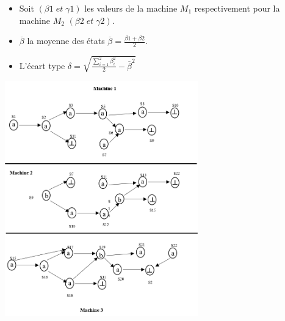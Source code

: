 \begin{itemize}
	\item  	Soit $(\beta1 \; et\; \gamma1)$ les valeurs de la machine $M_1$ respectivement pour la machine $M_2$ $(\beta2 \;et\; \gamma2)$.
	\item  	$\overline{\beta}$ la moyenne des états $\overline{\beta}=\frac{\beta1+\beta2}{2}$.
	\item  	L’écart type $\delta=\sqrt{\frac{\displaystyle\sum_{i=1}^{2}\beta_i^2 }{2}-\overline{\beta}^2} $
\end{itemize}
 
	\begin{center}
		\includegraphics[height=4in]{img/skd2.png}	
	 \label{skd2}
	\end{center}

